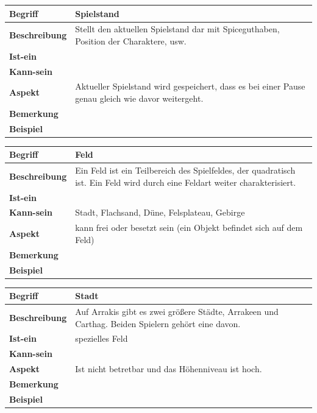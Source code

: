 \documentclass[12pt]{article}
\begin{document}
\begin{tabularx}{\linewidth}{|l|X|}
\hline
\textbf{Begriff} & \textbf{Spielstand} \\
\hline
\textbf{Beschreibung} & Stellt den aktuellen Spielstand dar mit Spiceguthaben, Position der Charaktere, usw. \\
\hline
\textbf{Ist-ein} & \\
\hline
\textbf{Kann-sein} & \\
\hline
\textbf{Aspekt} & Aktueller Spielstand wird gespeichert, dass es bei einer Pause genau gleich wie davor weitergeht.\\
\hline
\textbf{Bemerkung} &  \\
\hline
\textbf{Beispiel} &  \\
\hline
\end{tabularx}


\begin{tabularx}{\linewidth}{|l|X|}
\hline
\textbf{Begriff} & \textbf{Feld} \\
\hline
\textbf{Beschreibung} & Ein Feld ist ein Teilbereich des Spielfeldes, der quadratisch ist. Ein Feld wird durch eine Feldart weiter charakterisiert. \\
\hline
\textbf{Ist-ein} &  \\
\hline
\textbf{Kann-sein} & Stadt, Flachsand, Düne, Felsplateau, Gebirge \\
\hline
\textbf{Aspekt} & kann frei oder besetzt sein (ein Objekt befindet sich auf dem Feld) \\
\hline
\textbf{Bemerkung} &  \\
\hline
\textbf{Beispiel} & \\
\hline
\end{tabularx}

\begin{tabularx}{\linewidth}{|l|X|}
\hline
\textbf{Begriff} & \textbf{Stadt} \\
\hline
\textbf{Beschreibung} & Auf Arrakis gibt es zwei größere Städte, Arrakeen und Carthag. Beiden Spielern gehört eine davon. \\
\hline
\textbf{Ist-ein} & spezielles Feld \\
\hline
\textbf{Kann-sein} & \\
\hline
\textbf{Aspekt} & Ist nicht betretbar und das Höhenniveau ist hoch.\\
\hline
\textbf{Bemerkung} &  \\
\hline
\textbf{Beispiel} &  \\
\hline
\end{tabularx}
\end{document}
